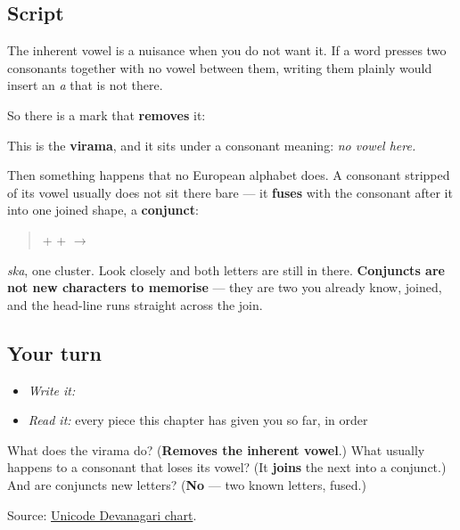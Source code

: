 \subsection*{Script}

The inherent vowel is a nuisance when you do not want it. If a word presses two consonants together with no vowel between them, writing them plainly would insert an \emph{a} that is not there.

So there is a mark that \textbf{removes} it:

\begin{quote}
\end{quote}

This is the \textbf{virama}, and it sits under a consonant meaning: \emph{no vowel here.}

Then something happens that no European alphabet does. A consonant stripped of its vowel usually does not sit there bare — it \textbf{fuses} with the consonant after it into one joined shape, a \textbf{conjunct}:

\begin{quote}
\textbf{} + \textbf{} + \textbf{} $\to$ \textbf{}
\end{quote}

\emph{ska}, one cluster. Look closely and both letters are still in there. \textbf{Conjuncts are not new characters to memorise} — they are two you already know, joined, and the head-line runs straight across the join.

\subsection*{Your turn}
\begin{itemize}
\raggedright
  \item \emph{Write it:} 
  \item \emph{Read it:} every piece this chapter has given you so far, in order
\end{itemize}

\begin{tcolorbox}[breakable,colback=teal!4,colframe=teal!35!black,title={Before you move on}]
What does the virama do? (\textbf{Removes the inherent vowel}.) What usually happens to a consonant that loses its vowel? (It \textbf{joins} the next into a conjunct.) And are conjuncts new letters? (\textbf{No} — two known letters, fused.)

Source: \href{https://www.unicode.org/charts/PDF/U0900.pdf}{Unicode Devanagari chart}.
\end{tcolorbox}
